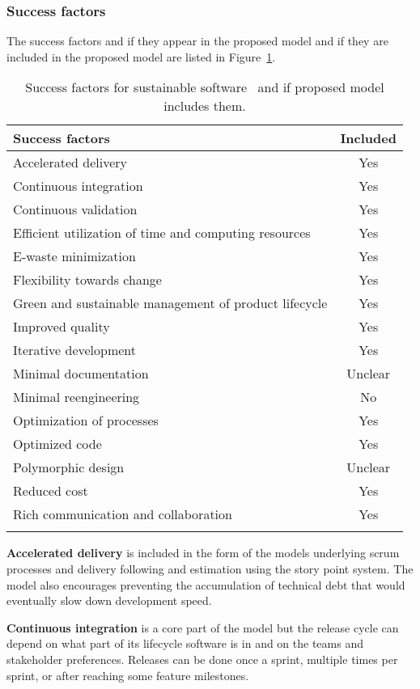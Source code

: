 \subsubsection{Success factors}
 The success factors and if they appear in the proposed model and if they are included in the proposed model are listed in Figure~\ref{succesfactors}.
\begin{longtable}{ |l|c| }
\hline
\textbf{Success factors} & \textbf{Included}\\
\hline
Accelerated delivery & Yes\\
\hline
Continuous integration & Yes\\
\hline
Continuous validation & Yes\\
\hline
Efficient utilization of time and computing resources & Yes\\
\hline
E-waste minimization & Yes\\
\hline
Flexibility towards change & Yes\\
\hline
Green and sustainable management of product lifecycle & Yes\\
\hline
Improved quality & Yes\\
\hline
Iterative development & Yes\\
\hline
Minimal documentation & Unclear\\
\hline
Minimal reengineering & No\\
\hline
Optimization of processes & Yes\\
\hline
Optimized code & Yes\\
\hline
Polymorphic design & Unclear\\
\hline
Reduced cost & Yes\\
\hline
Rich communication and collaboration & Yes\\
\hline
\caption{Success factors for sustainable software~\cite{greenagilematurity} and if proposed model includes them.}
\label{succesfactors}
\end{longtable}

\textbf{Accelerated delivery} is included in the form of the models underlying scrum processes and delivery following and estimation using the story point system. The model also encourages preventing the accumulation of technical debt that would eventually slow down development speed.

\textbf{Continuous integration} is a core part of the model but the release cycle can depend on what part of its lifecycle software is in and on the teams and stakeholder preferences. Releases can be done once a sprint, multiple times per sprint, or after reaching some feature milestones.

